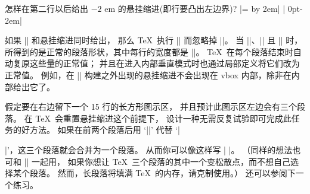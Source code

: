 \ddangerexercise 怎样在第二行以后给出 $-2$ em 的悬挂缩进(即行要凸出左边界)?
\answer |=\hsize \advance{} by 2em|\parbreak
| 0pt\hsize 0pt\hsize -2em|

\danger 如果 |\parshape| 和悬挂缩进同时给出，
那么 \TeX\ 执行 |\parshape| 而忽略掉 |\hangindent|。
当 ||、|\hangindent=0pt| 且 || 时，
所得到的是正常的段落形状，其中每行的宽度都是 |\hsize|。
\TeX\ 在每个段落结束时自动复原这些量的正常值；
并且在进入内部垂直模式时也通过局部定义将它们改为正常值。
例如，在 |\vbox| 构建之外出现的悬挂缩进不会出现在 vbox 内部，除非在内部给出它了。

\ddangerexercise 假定要在右边留下一个 15 行的长方形图示区，
并且预计此图示区左边会有三个段落。
在 \TeX\ 会重置悬挂缩进这个前提下，
设计一种无需反复试验即可完成此任务的好方法。
\answer 如果在前两个段落后用 `|\hfil\vadjust{\vskip\parskip}\break\indent|'
代替 `|\par|'，这三个段落就会合并为一个段落。
从而你可以像这样写 |\hangindent=-50pt |。
（同样的想法也可和 |\looseness| 一起用，
如果你想让 \TeX\ 三个段落的其中一个变松散点，而不想自己选择某个段落。
然而，长段落将填满 \TeX\ 的内存，请克制使用。）%
还可以参阅下一个练习。

